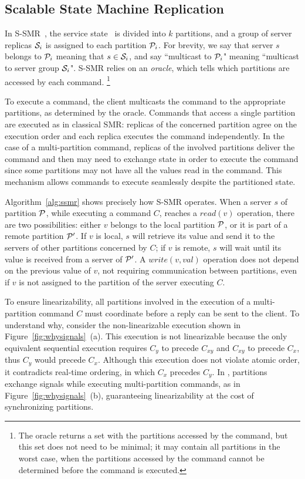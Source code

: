 \subsection{Scalable State Machine Replication}
\label{sec:ssmr}

In S-SMR~\cite{bezerra2014ssmr}, the service state \vvt\ is divided into $k$ partitions, and a group of server replicas $\mathcal{S}_i$ is assigned to each partition $\mathcal{P}_i$. For brevity, we say that server $s$ belongs to $\mathcal{P}_i$ meaning that $s \in \mathcal{S}_i$, and say ``multicast to $\mathcal{P}_i$" meaning ``multicast to server group $\mathcal{S}_i$".
S-SMR relies on an \emph{oracle}, which tells which partitions are accessed by each command.%
\footnote{The oracle returns a set with the partitions accessed by the command, but this set does not need to be minimal; it may contain all partitions in the worst case, when the partitions accessed by the command cannot be determined before the command is executed.}

To execute a command, the client multicasts the command to the appropriate partitions, as determined by the oracle.
Commands that access a single partition are executed as in classical SMR: replicas of the concerned partition agree on the execution order and each replica executes the command independently.
In the case of a multi-partition command, replicas of the involved partitions deliver the command and then may need to exchange state in order to execute the command since some partitions may not have all the values read in the command.
This mechanism allows commands to execute seamlessly despite the partitioned state.



Algorithm~\ref{alg:ssmr} shows precisely how S-SMR operates. When a server $s$ of partition $\mathcal{P}$, while executing a command $C$, reaches a $read(v)$ operation, there are two possibilities:
either $v$ belongs to the local partition $\mathcal{P}$,
or it is part of a remote partition $\mathcal{P}'$. 
If $v$ is local, $s$ will retrieve its value and send it to the servers of other partitions concerned by $C$;
if $v$ is remote, $s$ will wait until its value is received from a server of $\mathcal{P}'$. 
A $write(v, val)$ operation does not depend on the previous value of $v$, not requiring communication between partitions, even if $v$ is not assigned to the partition of the server executing $C$.

\pagebreak

To ensure linearizability, all partitions involved in the execution of a multi-partition command $C$ must coordinate before a reply can be sent to the client.
To understand why, consider the non-linearizable execution shown in Figure~\ref{fig:whysignals}~(a).
This execution is not linearizable because the only equivalent sequential execution requires $C_y$ to precede $C_{xy}$ and $C_{xy}$ to precede $C_x$, thus $C_y$ would precede $C_x$.
Although this execution does not violate atomic order, it contradicts real-time ordering, in which $C_x$ precedes $C_y$.
In \ssmr{}, partitions exchange signals while executing multi-partition commands, as in Figure~\ref{fig:whysignals}~(b), guaranteeing linearizability at the cost of synchronizing partitions.

